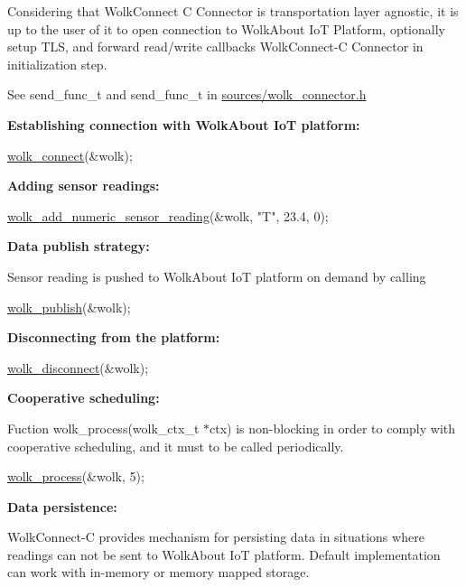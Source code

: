  Considering that Wolk\+Connect C Connector is transportation layer agnostic, it is up to the user of it to open connection to Wolk\+About IoT Platform, optionally setup T\+LS, and forward read/write callbacks Wolk\+Connect-\/C Connector in initialization step.

See {\ttfamily send\+\_\+func\+\_\+t} and {\ttfamily send\+\_\+func\+\_\+t} in {\ttfamily \hyperlink{wolk__connector_8h}{sources/wolk\+\_\+connector.\+h}}

{\bfseries Establishing connection with Wolk\+About IoT platform\+:} 
\begin{DoxyCode}
\hyperlink{wolk__connector_8h_ab246fad03ad57f3efe89f4ec2c93a288}{wolk\_connect}(&wolk);
\end{DoxyCode}
 {\bfseries Adding sensor readings\+:} 
\begin{DoxyCode}
\hyperlink{wolk__connector_8h_ab7bcc53c7c06a6cc2b8db5190b1af70f}{wolk\_add\_numeric\_sensor\_reading}(&wolk, \textcolor{stringliteral}{"T"}, 23.4, 0);
\end{DoxyCode}
 {\bfseries Data publish strategy\+:}

Sensor reading is pushed to Wolk\+About IoT platform on demand by calling 
\begin{DoxyCode}
\hyperlink{wolk__connector_8h_ac5e7ddb346ea4b9a7cc4511d3728be09}{wolk\_publish}(&wolk);
\end{DoxyCode}


{\bfseries Disconnecting from the platform\+:} 
\begin{DoxyCode}
\hyperlink{wolk__connector_8h_af174943365b8cddc1e6e9351996805c3}{wolk\_disconnect}(&wolk);
\end{DoxyCode}


{\bfseries Cooperative scheduling\+:}

Fuction {\ttfamily wolk\+\_\+process(wolk\+\_\+ctx\+\_\+t $\ast$ctx)} is non-\/blocking in order to comply with cooperative scheduling, and it must to be called periodically.


\begin{DoxyCode}
\hyperlink{wolk__connector_8h_a57a05d76cc96bc5de0ee0e9a23ca5a8e}{wolk\_process}(&wolk, 5);
\end{DoxyCode}


{\bfseries Data persistence\+:}

Wolk\+Connect-\/C provides mechanism for persisting data in situations where readings can not be sent to Wolk\+About IoT platform. Default implementation can work with in-\/memory or memory mapped storage.

